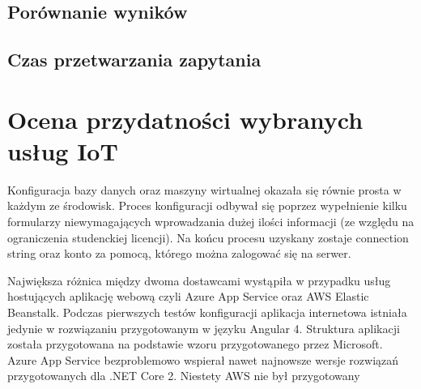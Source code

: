 \subsection{Porównanie wyników}
\subsection{Czas przetwarzania zapytania}

\section{Ocena przydatności wybranych usług IoT}



Konfiguracja bazy danych oraz maszyny wirtualnej okazała się równie prosta w każdym ze środowisk. Proces konfiguracji odbywał się poprzez wypełnienie kilku formularzy niewymagających wprowadzania dużej ilości informacji (ze względu na ograniczenia studenckiej licencji). Na końcu procesu uzyskany zostaje connection string oraz konto za pomocą, którego można zalogować się na serwer.

Największa różnica między dwoma dostawcami wystąpiła w przypadku usług hostujących aplikację webową czyli Azure App Service oraz AWS Elastic Beanstalk. Podczas pierwszych testów konfiguracji aplikacja internetowa istniała jedynie w rozwiązaniu przygotowanym w języku Angular 4. Struktura aplikacji została przygotowana na podstawie wzoru przygotowanego przez Microsoft. Azure App Service bezproblemowo wspierał nawet najnowsze wersje rozwiązań przygotowanych dla .NET Core 2. Niestety AWS nie był przygotowany 